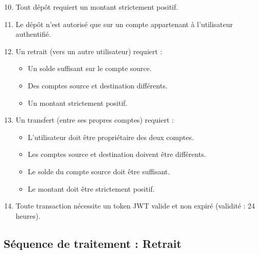 \documentclass[12pt,a4paper]{article}
\begin{document}
\begin{enumerate}[label=\textbf{RG-\arabic*}.]
    \setcounter{enumi}{9}
    \item Tout dépôt requiert un montant strictement positif.
    \item Le dépôt n'est autorisé que sur un compte appartenant à l'utilisateur authentifié.
    \item Un retrait (vers un autre utilisateur) requiert :
        \begin{itemize}
            \item Un solde suffisant sur le compte source.
            \item Des comptes source et destination différents.
            \item Un montant strictement positif.
        \end{itemize}
    \item Un transfert (entre ses propres comptes) requiert :
        \begin{itemize}
            \item L'utilisateur doit être propriétaire des deux comptes.
            \item Les comptes source et destination doivent être différents.
            \item Le solde du compte source doit être suffisant.
            \item Le montant doit être strictement positif.
        \end{itemize}
    \item Toute transaction nécessite un token JWT valide et non expiré (validité : 24 heures).
\end{enumerate}

\subsection{Séquence de traitement : Retrait}
\end{document}
